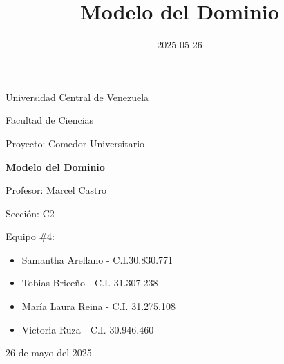 \documentclass[12pt]{article}
\title{Modelo del Dominio}
\date{2025-05-26}
\begin{document}
    \begin{titlepage}
        \centering
        {\Large Universidad Central de Venezuela \par}
        \vspace{0.25cm}
        {\Large Facultad de Ciencias \par}
        \vfill
        {\LARGE Proyecto: Comedor Universitario \par}
        \vspace{0.25cm}
        {\bfseries\Huge Modelo del Dominio \par}
        \vfill
        \raggedright
        {\large Profesor: Marcel Castro \par}
        {\large Sección: C2 \par}
        \vspace{0.5cm}
        {\large Equipo \#4: \par}
        \begin{itemize}
            \item {\large Samantha Arellano} - C.I.30.830.771
            \item {\large Tobias Briceño} - C.I. 31.307.238
            \item {\large María Laura Reina} - C.I. 31.275.108
            \item {\large Victoria Ruza} - C.I. 30.946.460
        \end{itemize}
        \vspace{1cm}
        \centering
        {\large 26 de mayo del 2025 \par}
    \end{titlepage}
\end{document}
